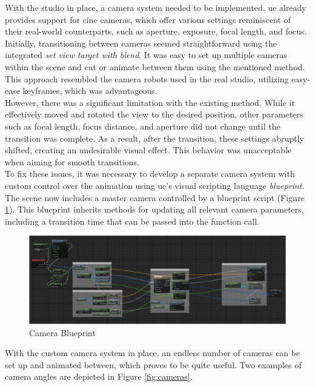 \documentclass[
  a4paper,  %
  twoside,  %
  bibliography=totoc,
  headsepline,
  cleardoublepage=empty,
  parskip=half,
  draft=false
]{scrbook}
\begin{document}
With the studio in place, a camera system needed to be implemented. \gls{ue} already provides support for cine cameras, which offer various settings reminiscent of their real-world counterparts, such as aperture, exposure, focal length, and focus. Initially, transitioning between cameras seemed straightforward using the integrated \textit{set view target with blend}. It was easy to set up multiple cameras within the scene and cut or animate between them using the mentioned method. This approach resembled the camera robots used in the real studio, utilizing easy-ease keyframes, which was advantageous. \\
However, there was a significant limitation with the existing method. While it effectively moved and rotated the view to the desired position, other parameters such as focal length, focus distance, and aperture did not change until the transition was complete. As a result, after the transition, these settings abruptly shifted, creating an undesirable visual effect. This behavior was unacceptable when aiming for smooth transitions. \\
To fix these issues, it was necessary to develop a separate camera system with custom control over the animation using \gls{ue}'s visual scripting language \textit{blueprint}. The scene now includes a master camera controlled by a blueprint script (Figure \ref{fig:blueprint}). This blueprint inherits methods for updating all relevant camera parameters, including a transition time that can be passed into the function call. 
\begin{figure}[h]
  \centering
  \includegraphics[width=1\textwidth]{graphics/unreal-engine/blueprint.png}
  \caption{Camera Blueprint}
  \label{fig:blueprint}
\end{figure}
With the custom camera system in place, an endless number of cameras can be set up and animated between, which proves to be quite useful. Two examples of camera angles are depicted in Figure \ref{fig:cameras}.
\end{document}
